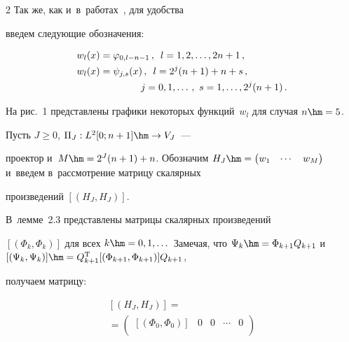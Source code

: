 \begin{multicols}{2}
Так же, как и~в~работах~\cite{Lepik1, Lepik2, Lepik3, Lepik4, Lepik}, для удобства  


введем следующие обозначения:


\begin{align*}


&w_l(x)=\varphi_{0,l-n-1}\,,\enskip l=1,2,\dots,2n+1\,,\\


&w_l(x)=\psi_{j,s}(x)\,,\enskip l=2^j(n+1)+n+s\,, \\


&\hspace*{23mm} j=0,1,\dots\,, \ s=1,\dots,2^{j}(n+1)\,.


\end{align*}


На рис.~1 представлены графики некоторых функций~$w_l$ для случая $n\hm=5$.














Пусть $J\geqslant 0$,  $\Pi_{J} : {L}^2[0;n+1]\hm\to V_{J}$~--- 


проектор и~$M\hm=2^{J}(n+1)+n$. Обозначим ${H}_J\hm=


\begin{pmatrix}w_1 & \cdots & w_M


\end{pmatrix}$ и~введем в~рассмотрение матрицу скалярных 


произведений $[({H}_J, {H}_J)]$. 


В~лемме~2.3 представлены матрицы скалярных произведений 


$[(\Phi_k, \Phi_k)]$ для всех $k\hm=0,1,\dots$ Замечая, что $\Psi_k \hm= 


\Phi_{k+1}{Q}_{k+1}$ и~$[(\Psi_k,\Psi_k)]\hm={Q}_{k+1}^{\mathrm{T}}


[( \Phi_{k+1}, \Phi_{k+1})]{Q}_{k+1}$,


получаем матрицу:


{\small \begin{multline*}


\left[({H}_J, {H}_J)\right]={}\\


\!{}=\!


\begin{pmatrix}


\left[(\Phi_0, \Phi_0)\right] & 0 & 0 & \cdots & 0\\



\end{pmatrix}
\end{multline*}}
\end{multicols}
